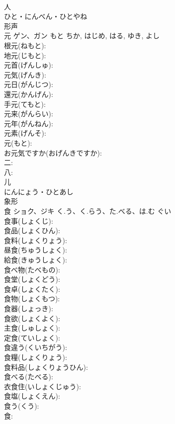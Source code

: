 \documentclass[8pt]{extreport}
\begin{document}
\begin{CJK}{UTF8}{min}
\\	人	
\\	ひと・にんべん・ひとやね	
\\	形声 
\\	元	ゲン、ガン	もと	ちか, はじめ, はる, ゆき, よし	
\\	根元(ねもと): 
\\	地元(じもと): 
\\	元首(げんしゅ): 
\\	元気(げんき): 
\\	元日(がんじつ): 
\\	還元(かんげん): 
\\	手元(てもと): 
\\	元来(がんらい): 
\\	元年(がんねん): 
\\	元素(げんそ): 
\\	元(もと): 
\\	お元気ですか(おげんきですか): 
\\	二: 
\\	八: 
\\	儿	
\\	にんにょう・ひとあし	
\\	象形 
\\	食	ショク、ジキ	く.う、く.らう、た.べる、は.む	ぐい	
\\	食事(しょくじ): 
\\	食品(しょくひん): 
\\	食料(しょくりょう): 
\\	昼食(ちゅうしょく): 
\\	給食(きゅうしょく): 
\\	食べ物(たべもの): 
\\	食堂(しょくどう): 
\\	食卓(しょくたく): 
\\	食物(しょくもつ): 
\\	食器(しょっき): 
\\	食欲(しょくよく): 
\\	主食(しゅしょく): 
\\	定食(ていしょく): 
\\	食違う(くいちがう): 
\\	食糧(しょくりょう): 
\\	食料品(しょくりょうひん): 
\\	食べる(たべる): 
\\	衣食住(いしょくじゅう): 
\\	食塩(しょくえん): 
\\	食う(くう): 
\\	食: 

\end{CJK}
\end{document}
